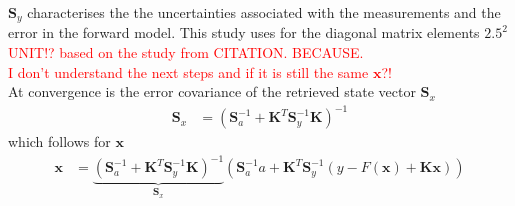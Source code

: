 $\mathbf{S}_y$ characterises the the uncertainties associated with the measurements and the error in the forward model. This study uses for the diagonal matrix elements $2.5^2$ \textcolor{red}{UNIT!? based on the study from CITATION. BECAUSE.}
\\
%
\textcolor{red}{I don't understand the next steps and if it is still the same $\mathbf{x}$?!} 
\\
At convergence is the error covariance of the retrieved state vector $\mathbf{S}_x$
\begin{align}
\mathbf{S}_x & = \left( \mathbf{S}_a^{-1} + \mathbf{K}^T \mathbf{S}_y^{-1} \mathbf{K} \right)^{-1}
\end{align}
which follows for $\mathbf{x}$
\begin{align}
\mathbf{x} & = \underbrace{\left( \mathbf{S}_a^{-1} + \mathbf{K}^T \mathbf{S}_y^{-1} \mathbf{K} \right)^{-1} }_\text{$\mathbf{S}_x$} \left( \mathbf{S}_a^{-1} a + \mathbf{K}^T \mathbf{S}_y^{-1} \left(y - F(\mathbf{x}) + \mathbf{K} \mathbf{x} \right)  \right)
\end{align}
